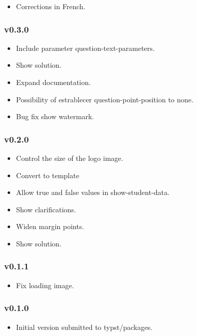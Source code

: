\begin{itemize}
\tightlist
\item
  Corrections in French.
\end{itemize}

\subsubsection{v0.3.0}\label{v0.3.0}

\begin{itemize}
\tightlist
\item
  Include parameter question-text-parameters.
\item
  Show solution.
\item
  Expand documentation.
\item
  Possibility of estrablecer question-point-position to none.
\item
  Bug fix show watermark.
\end{itemize}

\subsubsection{v0.2.0}\label{v0.2.0}

\begin{itemize}
\tightlist
\item
  Control the size of the logo image.
\item
  Convert to template
\item
  Allow true and false values in show-student-data.
\item
  Show clarifications.
\item
  Widen margin points.
\item
  Show solution.
\end{itemize}

\subsubsection{v0.1.1}\label{v0.1.1}

\begin{itemize}
\tightlist
\item
  Fix loading image.
\end{itemize}

\subsubsection{v0.1.0}\label{v0.1.0}

\begin{itemize}
\tightlist
\item
  Initial version submitted to typst/packages.
\end{itemize}

